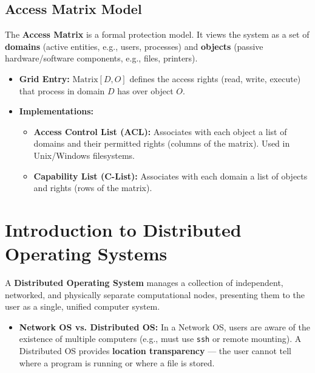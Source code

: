 \documentclass[12pt,a4paper]{article}
\begin{document}
\subsection{Access Matrix Model}
The \textbf{Access Matrix} is a formal protection model. It views the system as a set of \textbf{domains} (active entities, e.g., users, processes) and \textbf{objects} (passive hardware/software components, e.g., files, printers).
\begin{itemize}[leftmargin=*, itemsep=3pt]
  \item \textbf{Grid Entry:} $\text{Matrix}[D, O]$ defines the access rights (read, write, execute) that process in domain $D$ has over object $O$.
  \item \textbf{Implementations:}
  \begin{itemize}[leftmargin=*, itemsep=2.5pt, topsep=0pt]
    \item \textbf{Access Control List (ACL):} Associates with each object a list of domains and their permitted rights (columns of the matrix). Used in Unix/Windows filesystems.
    \item \textbf{Capability List (C-List):} Associates with each domain a list of objects and rights (rows of the matrix).
    \end{itemize}
  \end{itemize}

\section{Introduction to Distributed Operating Systems}

A \textbf{Distributed Operating System} manages a collection of independent, networked, and physically separate computational nodes, presenting them to the user as a single, unified computer system.
\begin{itemize}[leftmargin=*, itemsep=3pt]
  \item \textbf{Network OS vs. Distributed OS:} In a Network OS, users are aware of the existence of multiple computers (e.g., must use \texttt{ssh} or remote mounting). A Distributed OS provides \textbf{location transparency} --- the user cannot tell where a program is running or where a file is stored.
\end{itemize}

\end{document}
